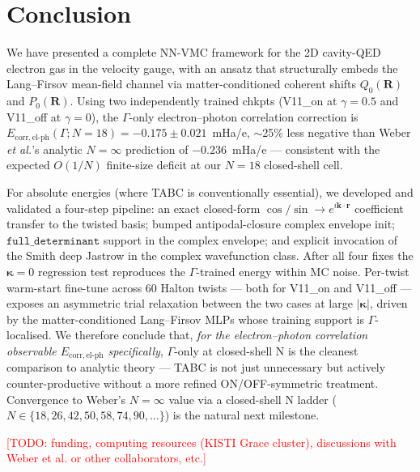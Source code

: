 \documentclass[reprint,amsmath,amssymb,aps,prb,floatfix,nofootinbib]{revtex4-2}
\newcommand{\todo}[1]{\textcolor{red}{[TODO: #1]}}
\newcommand{\Ehp}{E_{\mathrm{corr},\mathrm{el}\text{-}\mathrm{ph}}}
\begin{document}
\section{Conclusion}\label{sec:conclusion}
We have presented a complete NN-VMC framework for the 2D
cavity-QED electron gas in the velocity gauge, with an ansatz that
structurally embeds the Lang--Firsov mean-field channel via
matter-conditioned coherent shifts $Q_0(\mathbf{R})$ and
$P_0(\mathbf{R})$.  Using two independently trained chkpts
(V11\_on at $\gamma = 0.5$ and V11\_off at $\gamma = 0$), the
$\Gamma$-only electron--photon correlation correction is
$\Ehp(\Gamma; N{=}18) = -0.175 \pm 0.021$~mHa/e, $\sim$25\% less
negative than Weber \emph{et al.}'s analytic $N{=}\infty$
prediction of $-0.236$~mHa/e --- consistent with the expected
$O(1/N)$ finite-size deficit at our $N = 18$ closed-shell cell.

For absolute energies (where TABC is conventionally essential), we
developed and validated a four-step pipeline: an exact closed-form
$\cos/\sin \to e^{i \mathbf{k}\cdot\mathbf{r}}$ coefficient transfer
to the twisted basis; bumped antipodal-closure complex envelope
init; $\mathtt{full\_determinant}$ support in the complex envelope;
and explicit invocation of the Smith deep Jastrow in the complex
wavefunction class.  After all four fixes the $\bm\kappa = 0$
regression test reproduces the $\Gamma$-trained energy within MC
noise.  Per-twist warm-start fine-tune across 60 Halton twists ---
both for V11\_on and V11\_off --- exposes an asymmetric trial
relaxation between the two cases at large $|\bm\kappa|$, driven by
the matter-conditioned Lang--Firsov MLPs whose training support is
$\Gamma$-localised.  We therefore conclude that, \emph{for the
electron--photon correlation observable $\Ehp$ specifically},
$\Gamma$-only at closed-shell N is the cleanest comparison to
analytic theory --- TABC is not just unnecessary but actively
counter-productive without a more refined ON/OFF-symmetric
treatment.  Convergence to Weber's $N{=}\infty$ value via a
closed-shell N ladder ($N \in \{18, 26, 42, 50, 58, 74, 90, \ldots\}$)
is the natural next milestone.

\begin{acknowledgments}
\todo{funding, computing resources (KISTI Grace cluster), discussions
with Weber et al. or other collaborators, etc.}
\end{acknowledgments}

\appendix
\end{document}
